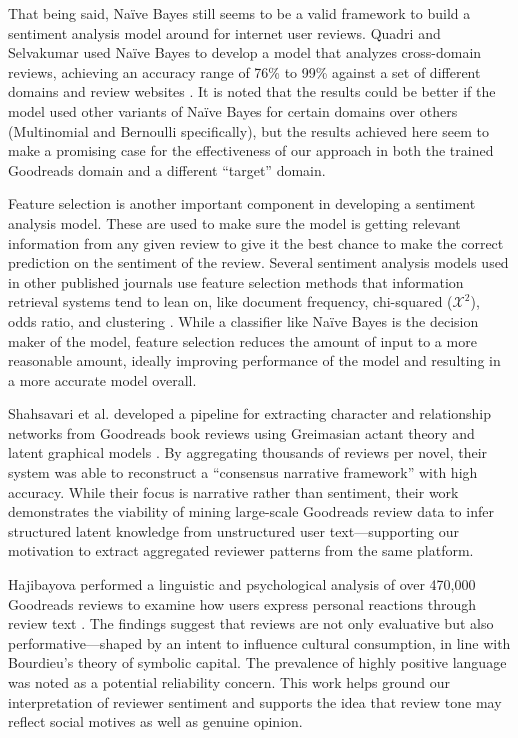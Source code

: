 That being said, Na\"ive Bayes still seems to be a valid framework to build a sentiment analysis model around for
internet user reviews. Quadri and Selvakumar used Na\"ive Bayes to develop a model that analyzes cross-domain
reviews, achieving an accuracy range of 76\% to 99\% against a set of different domains and review websites 
\cite{Quadri2020}. It is noted that the results could be better if the model used other variants of Na\"ive Bayes
for certain domains over others (Multinomial and Bernoulli specifically), but the results achieved here seem to make
a promising case for the effectiveness of our approach in both the trained Goodreads domain and a different
``target'' domain.

Feature selection is another important component in developing a sentiment analysis model. These are used to make
sure the model is getting relevant information from any given review to give it the best chance to make the correct
prediction on the sentiment of the review. Several sentiment analysis models used in other published journals use
feature selection methods that information retrieval systems tend to lean on, like document frequency, chi-squared ($\mathcal{X}^2$),
odds ratio, and clustering \cite{Hung2015}. While a classifier like Na\"ive Bayes is the decision maker of the model, feature selection
reduces the amount of input to a more reasonable amount, ideally improving performance of the model and resulting
in a more accurate model overall.

Shahsavari et al. developed a pipeline for extracting character and relationship networks from Goodreads book reviews using Greimasian actant theory and latent graphical models \cite{shahsavari2020}. By aggregating thousands of reviews per novel, their system was able to reconstruct a ``consensus narrative framework'' with high accuracy. While their focus is narrative rather than sentiment, their work demonstrates the viability of mining large-scale Goodreads review data to infer structured latent knowledge from unstructured user text—supporting our motivation to extract aggregated reviewer patterns from the same platform.

Hajibayova performed a linguistic and psychological analysis of over 470,000 Goodreads reviews to examine how users express personal reactions through review text \cite{hajibayova2019}. The findings suggest that reviews are not only evaluative but also performative—shaped by an intent to influence cultural consumption, in line with Bourdieu’s theory of symbolic capital. The prevalence of highly positive language was noted as a potential reliability concern. This work helps ground our interpretation of reviewer sentiment and supports the idea that review tone may reflect social motives as well as genuine opinion.
